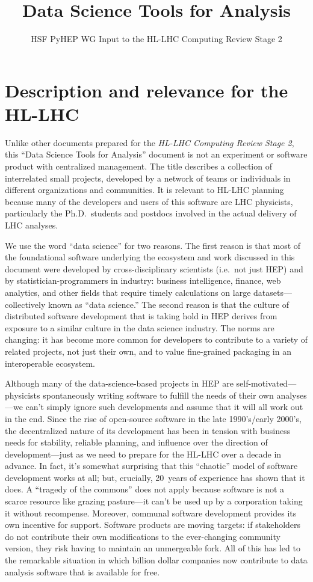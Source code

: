 \documentclass[12pt,a4paper]{article}
\begin{document}
\title{Data Science Tools for Analysis}
\author{HSF PyHEP WG Input to the HL-LHC Computing Review Stage 2}
\maketitle

\section{Description and relevance for the HL-LHC}

Unlike other documents prepared for the \textit{HL-LHC Computing Review Stage 2}, this ``Data Science Tools for Analysis'' document is not an experiment or software product with centralized management. The title describes a collection of interrelated small projects, developed by a network of teams or individuals in different organizations and communities. It is relevant to HL-LHC planning because many of the developers and users of this software are LHC physicists, particularly the Ph.D.\ students and postdocs involved in the actual delivery of LHC analyses.

We use the word ``data science'' for two reasons. The first reason is that most of the foundational software underlying the ecosystem and work discussed in this document were developed by cross-disciplinary scientists (i.e.\ not just HEP) and by statistician-programmers in industry: business intelligence, finance, web analytics, and other fields that require timely calculations on large datasets---collectively known as ``data science.'' The second reason is that the culture of distributed software development that is taking hold in HEP derives from exposure to a similar culture in the data science industry. The norms are changing: it has become more common for developers to contribute to a variety of related projects, not just their own, and to value fine-grained packaging in an interoperable ecosystem.

Although many of the data-science-based projects in HEP are self-motivated---physicists spontaneously writing software to fulfill the needs of their own analyses---we can't simply ignore such developments and assume that it will all work out in the end. Since the rise of open-source software in the late 1990's/early 2000's, the decentralized nature of its development has been in tension with business needs for stability, reliable planning, and influence over the direction of development---just as we need to prepare for the HL-LHC over a decade in advance. In fact, it's somewhat surprising that this ``chaotic'' model of software development works at all; but, crucially, 20~years of experience has shown that it does. A ``tragedy of the commons'' does not apply because software is not a scarce resource like grazing pasture---it can't be used up by a corporation taking it without recompense. Moreover, communal software development provides its own incentive for support. Software products are moving targets: if stakeholders do not contribute their own modifications to the ever-changing community version, they risk having to maintain an unmergeable fork. All of this has led to the remarkable situation in which billion dollar companies now contribute to data analysis software that is available for free.
\end{document}
